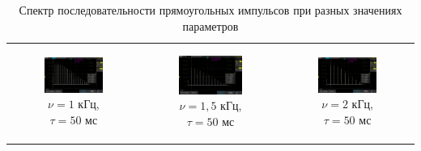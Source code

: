 \documentclass[a4paper,12pt]{article} %
\begin{document}
\begin{table}[ht]
\begin{tabular}{ccc}
\newline
\begin{subfigure}{0.3\textwidth}\centering\includegraphics[width=\columnwidth]{I/AKIP0009.png}\caption{$\nu = 1$ кГц, $\tau = 50$ мс}\end{subfigure} &
\begin{subfigure}{0.3\textwidth}\centering\includegraphics[width=\columnwidth]{I/AKIP0010.png}\caption{$\nu = 1,5$ кГц, $\tau = 50$ мс}\end{subfigure} &
\begin{subfigure}{0.3\textwidth}\centering\includegraphics[width=\columnwidth]{I/AKIP0011.png}\caption{$\nu = 2$ кГц, $\tau = 50$ мс}\end{subfigure} \\
\end{tabular}
\caption{Спектр последовательности прямоугольных импульсов при разных значениях параметров}
\label{tab:picsI}
\end{table}
\end{document}
